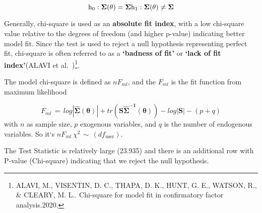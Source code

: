 \documentclass[
]{article}
\newenvironment{Shaded}{\begin{snugshade}}{\end{snugshade}}
\newcommand{\CommentTok}[1]{\textcolor[rgb]{0.56,0.35,0.01}{\textit{#1}}}
\newcommand{\FunctionTok}[1]{\textcolor[rgb]{0.00,0.00,0.00}{#1}}
\newcommand{\NormalTok}[1]{#1}
\newcommand{\SpecialCharTok}[1]{\textcolor[rgb]{0.00,0.00,0.00}{#1}}
\begin{document}
\[
\text{h}_{0}: \mathbf{\Sigma{(\theta})}=\mathbf{\Sigma}\\
\text{h}_{1}: \mathbf{\Sigma{(\theta})} \neq \mathbf{\Sigma}
\]

Generally, chi-square is used as an \textbf{absolute fit index}, with a
low chi-square value relative to the degrees of freedom (and higher
p-value) indicating better model fit. Since the test is used to reject a
null hypothesis representing perfect fit, chi-square is often referred
to as a \textbf{`badness of fit'} or \textbf{`lack of fit index'}(ALAVI
et al.~)\footnote{ALAVI, M., VISENTIN, D. C., THAPA, D. K., HUNT, G. E.,
  WATSON, R., \& CLEARY, M. L.. Chi-square for model fit in confirmatory
  factor analysis.2020.}.

The model chi-square is defined as \(nF_{ml}\), and the \(F_{ml}\) is
the fit function from maximum likelihood

\[
F_{ml}\,=\,log|\mathbf{\hat{\Sigma}(\theta)}|+tr(\mathbf{S}\mathbf{\hat{\Sigma}^{-1}(\theta)})-log|\mathbf{S}|-(p+q)
\] with \(n\) as sample size, \(p\) exogenous variables, and \(q\) is
the number of endogenous variables. So it`s
\(nF_{ml}\,\chi^{2}\, \sim \, (df_{\text{user}})\).

The Test Statistic is relatively large (23.935) and there is an
additional row with P-value (Chi-square) indicating that we reject the
null hypothesis.

\begin{Shaded}
\end{Shaded}
\end{document}

